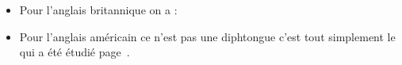 \newpage

\section{  }\label{sec:ieenv}

\begin{itemize}
\item Pour l'anglais britannique on a :
\item Pour l'anglais américain ce n'est pas une diphtongue c'est tout
  simplement le qui a été étudié page~\pageref{chap:soni}.
\end{itemize}

